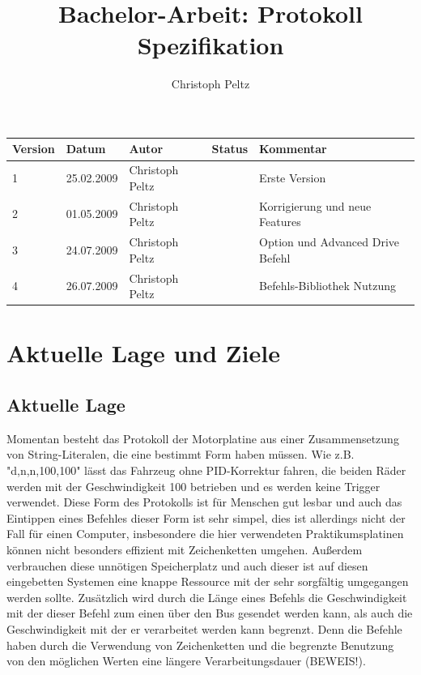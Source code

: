 \documentclass[a4paper]{article}
\title{Bachelor-Arbeit: Protokoll Spezifikation}
\author{Christoph Peltz}
\begin{document}
\maketitle
	\begin{tabularx}{\linewidth}{|l|l|l|l|X|}
		\hline
		\textbf{Version} & \textbf{Datum} & \textbf{Autor} 	& \textbf{Status} & \textbf{Kommentar} \\
		\hline
		\hline
		1 				 & 25.02.2009 	  & Christoph Peltz & 				  & Erste Version \\
		2 				 & 01.05.2009 	  & Christoph Peltz & 				  & Korrigierung und neue Features \\
		3				 & 24.07.2009	  & Christoph Peltz &				  & Option und Advanced Drive Befehl \\
		4				 & 26.07.2009	  & Christoph Peltz &				  & Befehls-Bibliothek Nutzung\\
		\hline
	\end{tabularx}

\pagebreak
\tableofcontents
\pagebreak
	\section{Aktuelle Lage und Ziele}

	\subsection{Aktuelle Lage}

	Momentan besteht das Protokoll der Motorplatine aus einer Zusammensetzung von String-Literalen, die eine bestimmt Form haben müssen.
	Wie z.B. "d,n,n,100,100" lässt das Fahrzeug ohne PID-Korrektur fahren, die beiden Räder werden mit der Geschwindigkeit 100
	betrieben und es werden keine Trigger verwendet. Diese Form des Protokolls ist für Menschen gut lesbar und auch das Eintippen
	eines Befehles dieser Form ist sehr simpel, dies ist allerdings nicht der Fall für einen Computer, insbesondere die hier
	verwendeten Praktikumsplatinen können nicht besonders effizient mit Zeichenketten umgehen. Außerdem verbrauchen diese unnötigen
	Speicherplatz und auch dieser ist auf diesen eingebetten Systemen eine knappe Ressource mit der sehr sorgfältig umgegangen
	werden sollte. Zusätzlich wird durch die Länge eines Befehls die Geschwindigkeit mit der dieser Befehl zum einen über den Bus
	gesendet werden kann, als auch die Geschwindigkeit mit der er verarbeitet werden kann begrenzt. Denn die Befehle haben durch
	die Verwendung von Zeichenketten und die begrenzte Benutzung von den möglichen Werten eine längere Verarbeitungsdauer (BEWEIS!).
\end{document}
